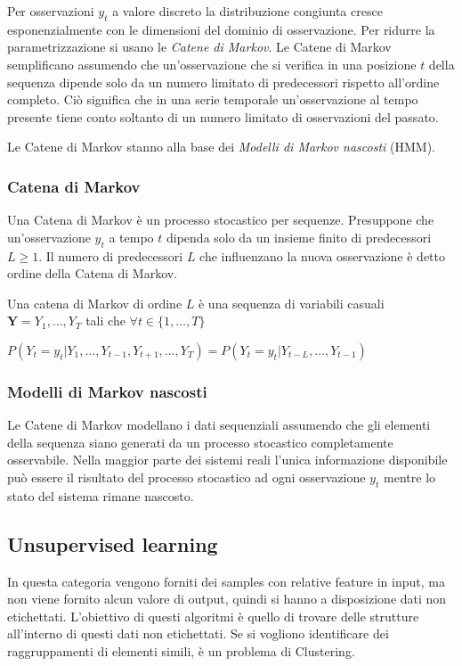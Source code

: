 \documentclass[../main.tex]{subfiles}
\begin{document}
Per osservazioni ${y} _ {t}$ a valore discreto la distribuzione congiunta cresce esponenzialmente con le dimensioni del dominio di osservazione. Per ridurre la parametrizzazione si usano le \textit{Catene di Markov}. Le Catene di Markov semplificano assumendo che un'osservazione che si verifica in una posizione $t$ della sequenza dipende solo da un numero limitato di predecessori rispetto all'ordine completo.
Ciò significa che in una serie temporale un'osservazione al tempo presente tiene conto soltanto di un numero limitato di osservazioni del passato.

Le Catene di Markov stanno alla base dei \textit{Modelli di Markov nascosti} (HMM).

\subsubsection{Catena di Markov}
Una Catena di Markov è un processo stocastico per sequenze. Presuppone che un'osservazione ${y} _ {t}$ a tempo $t$ dipenda solo da un insieme finito di predecessori $L \geq 1$. Il numero di predecessori $L$ che influenzano la nuova osservazione è detto ordine della Catena di Markov.

Una catena di Markov di ordine $L$ è una sequenza di variabili casuali $\mathbf { Y } = Y _ { 1 } , \ldots , Y _ { T }$ tali che $\forall t \in \{ 1 , \ldots , T \}$

\begin{center}
				\begin{math}
								P \left( Y _ { t } = y _ { t } | Y _ { 1 } , \ldots , Y _ { t - 1 } , Y _ { t + 1 } , \ldots , Y _ { T } \right) = P \left( Y _ { t } = y _ { t } | Y _ { t - L } , \ldots , Y _ { t - 1 } \right)
				\end{math}
\end{center}

\subsubsection{Modelli di Markov nascosti}
Le Catene di Markov modellano i dati sequenziali assumendo che gli elementi della sequenza siano generati da un processo stocastico completamente osservabile. Nella maggior parte dei sistemi reali l'unica informazione disponibile può essere il risultato del processo stocastico ad ogni osservazione ${y} _ {t}$ mentre lo stato del sistema rimane nascosto. 

\subsection{Unsupervised learning}
In questa categoria vengono forniti dei samples con relative feature in input, ma non viene fornito alcun valore di output, quindi si hanno a disposizione dati non etichettati. L'obiettivo di questi algoritmi è quello di trovare delle strutture all'interno di questi dati non etichettati. Se si vogliono identificare dei raggruppamenti di elementi simili, è un problema di Clustering.
\end{document}
